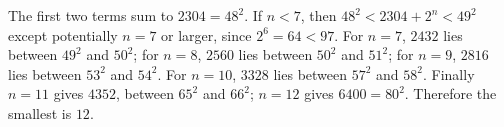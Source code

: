 The first two terms sum to $2304=48^2$. If $n<7$, then $48^2<2304+2^n<49^2$ except potentially $n=7$ or larger, since $2^6=64<97$. For $n=7$, $2432$ lies between $49^2$ and $50^2$; for $n=8$, $2560$ lies between $50^2$ and $51^2$; for $n=9$, $2816$ lies between $53^2$ and $54^2$. For $n=10$, $3328$ lies between $57^2$ and $58^2$. Finally $n=11$ gives $4352$, between $65^2$ and $66^2$; $n=12$ gives $6400=80^2$. Therefore the smallest is $\boxed{12}$.
